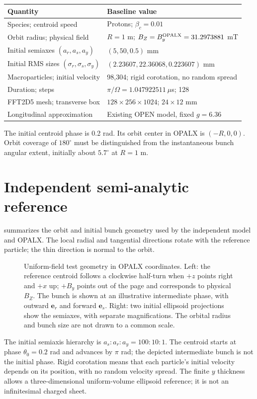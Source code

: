 \documentclass[10pt,a4paper]{article}
\begin{document}
\begin{center}\small
\begin{tabular}{ll}\toprule
Quantity & Baseline value\\\midrule
Species; centroid speed & Protons; $\beta_c=0.01$\\
Orbit radius; physical field & $R=1$ m; $B_Z=B_y^{\rm OPALX}=31.2973881$ mT\\
Initial semiaxes $(a_r,a_s,a_y)$ & $(5,50,0.5)$ mm\\
Initial RMS sizes $(\sigma_r,\sigma_s,\sigma_y)$ & $(2.23607,22.36068,0.223607)$ mm\\
Macroparticles; initial velocity & 98,304; rigid corotation, no random spread\\
Duration; steps & $\pi/\Omega=1.047922511~\mu$s; 128\\
FFT2D5 mesh; transverse box & $128\times256\times1024$; $24\times12$ mm\\
Longitudinal approximation & Existing OPEN model, fixed $g=6.36$\\\bottomrule
\end{tabular}
\end{center}
The initial centroid phase is 0.2 rad. Its orbit center in OPALX is
$(-R,0,0)$. Orbit coverage of $180^\circ$ must be distinguished from the
instantaneous bunch angular extent, initially about $5.7^\circ$ at $R=1$ m.

\clearpage
\section{Independent semi-analytic reference}
 summarizes the orbit and initial bunch geometry used
by the independent model and OPALX. The local radial and tangential directions
rotate with the reference particle; the thin direction is normal to the orbit.
\begin{figure}[H]
 \centering
 
 \caption{Uniform-field test geometry in OPALX coordinates. Left: the reference
 centroid follows a clockwise half-turn when $+z$ points right and $+x$ up;
 $+B_y$ points out of the page and corresponds to physical $B_Z$.
 The bunch is shown at an illustrative intermediate phase, with outward
 $\bm e_r$ and forward $\bm e_s$. Right: two initial ellipsoid projections
 show the semiaxes, with separate magnifications. The orbital radius and bunch
 size are not drawn to a common scale.}
 \label{fig:test-geometry}
\end{figure}
The initial semiaxis hierarchy is $a_s:a_r:a_y=100:10:1$.
The centroid starts at phase $\theta_0=0.2$ rad and advances by $\pi$ rad;
the depicted intermediate bunch is not the initial phase. Rigid corotation
means that each particle's initial velocity depends on its position, with no
random velocity spread. The finite $y$ thickness allows a three-dimensional
uniform-volume ellipsoid reference; it is not an infinitesimal charged sheet.
\end{document}
